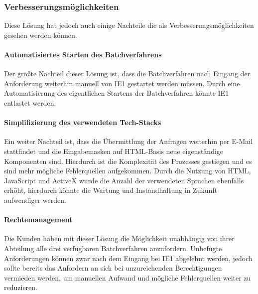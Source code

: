 		\subsubsection{Verbesserungsmöglichkeiten}
		
			Diese Lösung hat jedoch auch einige Nachteile die als Verbesserungsmöglichkeiten gesehen werden können.
		
			\paragraph{Automatisiertes Starten des Batchverfahrens}
			
				Der größte Nachteil dieser Lösung ist, dass die Batchverfahren nach Eingang der Anforderung weiterhin manuell von \ac{IE1} gestartet werden müssen. Durch eine Automatisierung des eigentlichen Startens der Batchverfahren könnte \ac{IE1} entlastet werden.     
			
			\paragraph{Simplifizierung des verwendeten Tech-Stacks}

				Ein weiter Nachteil ist, dass die Übermittlung der Anfragen weiterhin per E-Mail stattfindet und die Eingabemasken auf HTML-Basis neue eigenständige Komponenten sind. Hierdurch ist die Komplexität des Prozesses gestiegen und es sind mehr mögliche Fehlerquellen aufgekommen. Durch die Nutzung von HTML, JavaScript und ActiveX wurde die Anzahl der verwendeten Sprachen ebenfalls erhöht, hierdurch könnte die Wartung und Instandhaltung in Zukunft aufwendiger werden.  
				
			\paragraph{Rechtemanagement}
			
				Die Kunden haben mit dieser Lösung die Möglichkeit unabhängig von ihrer Abteilung alle drei verfügbaren Batchverfahren anzufordern. Unbefugte Anforderungen können zwar nach dem Eingang bei \ac{IE1} abgelehnt werden, jedoch sollte bereits das Anfordern an sich bei unzureichenden Berechtigungen vermieden werden, um manuellen Aufwand und mögliche Fehlerquellen weiter zu reduzieren. 
		